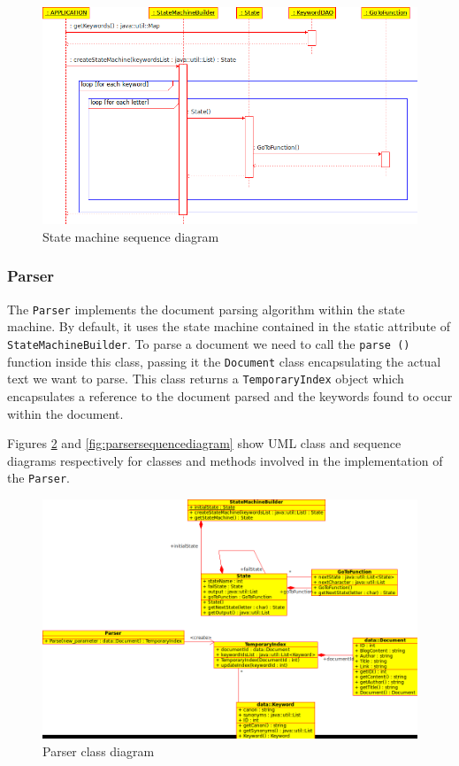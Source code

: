 \documentclass[10pt]{report}
\begin{document}
\begin{figure}
  \begin{center}
        \includegraphics[width=\textwidth,height=!]{statemachinesequencediagram}
  \end{center}
  \caption{State machine sequence diagram}
  \label{fig:statemachinesequencediagram}
\end{figure} 


\subsubsection{Parser}
The \texttt{Parser} implements the document parsing algorithm within
the state machine. By default, it uses the state machine contained
in the static attribute of \texttt{StateMachineBuilder}. To parse a
document we need to call the \texttt{parse ()} function inside this
class, passing it the \texttt{Document} class encapsulating the actual
text we want to parse. This class returns a \texttt{TemporaryIndex}
object which encapsulates a reference to the document parsed and the
keywords found to occur within the document.

Figures \ref{fig:parserclassdiagram} and
\ref{fig:parsersequencediagram} show UML class and sequence
diagrams respectively for classes and methods involved in the
implementation of the \texttt{Parser}.

\begin{figure}[h!]
  \begin{center}
        \includegraphics[width=\textwidth,height=!]{parserclassdiagram}
  \end{center}
  \caption{Parser class diagram}
  \label{fig:parserclassdiagram}
\end{figure} 
\end{document}
